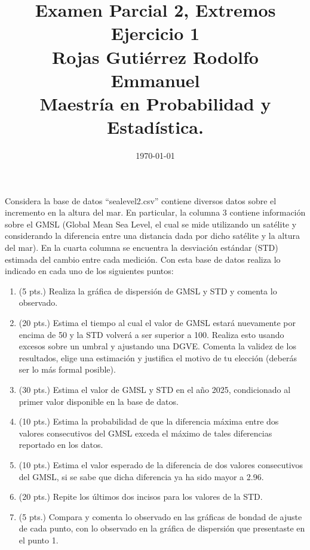 \documentclass[10.5pt,notitlepage]{article}
\title{Examen Parcial 2, Extremos \\
Ejercicio 1\\
Rojas Gutiérrez Rodolfo Emmanuel\\ 
Maestría en Probabilidad y Estadística.}
\date{\today}
\theoremstyle{plain}
\begin{document}
\maketitle
\setcounter{exo}{0}
\begin{exo}
 Considera la base de datos “sealevel2.csv” contiene diversos datos sobre el incremento en la altura del mar.
En particular, la columna 3 contiene información sobre el GMSL (Global Mean Sea Level, el cual se mide utilizando un satélite y considerando la diferencia entre una distancia dada por dicho satélite y la altura del mar). En la cuarta columna se encuentra la desviación estándar (STD) estimada del cambio entre cada medición. Con esta base de datos realiza lo indicado en cada uno de los siguientes puntos:
\begin{enumerate}
\item (5 pts.) Realiza la gráfica de dispersión de GMSL y STD y comenta lo observado.
\item (20 pts.) Estima el tiempo al cual el valor de GMSL estará nuevamente por encima de 50 y la STD volverá a ser superior a 100. Realiza esto usando excesos sobre un umbral y ajustando una DGVE. Comenta la validez de los resultados, elige una estimación y justifica el motivo de tu elección (deberás ser lo más formal posible).
\item (30 pts.) Estima el valor de GMSL y STD en el año 2025, condicionado al primer valor disponible en la base de datos.
\item (10 pts.) Estima la probabilidad de que la diferencia máxima entre dos valores consecutivos del GMSL exceda el máximo de tales diferencias reportado en los datos.
\item (10 pts.) Estima el valor esperado de la diferencia de dos valores consecutivos del GMSL, si se sabe que dicha diferencia ya ha sido mayor a 2.96.
\item (20 pts.) Repite los últimos dos incisos para los valores de la STD. 
\item (5 pts.) Compara y comenta lo observado en las gráficas de bondad de ajuste de cada punto, con lo observado en la gráfica de dispersión que presentaste en el punto 1.
\end{enumerate}
\end{exo}
\end{document}
